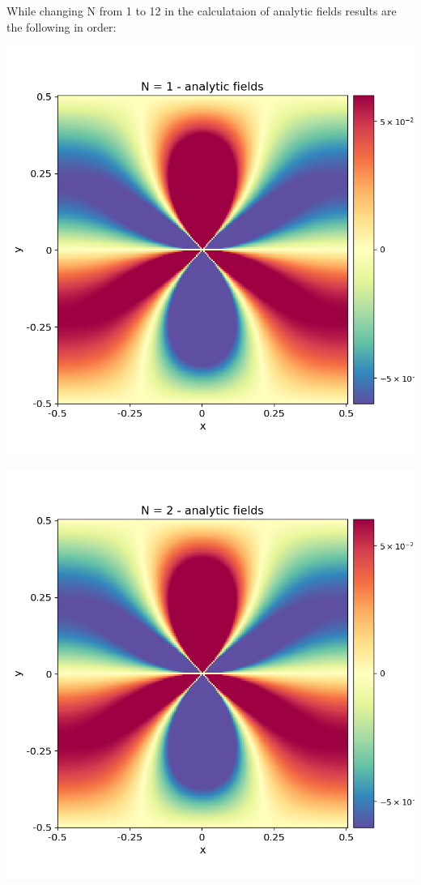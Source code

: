 \documentclass[12pt,a4paper]{article}
\theoremstyle{plain}
\begin{document}
\begin{multicols*}{2}
	\par While changing N from 1 to 12 in the calculataion of analytic fields results are the
	following in order:

	\vspace{1cm}

	\begin{minipage}{0.22\columnwidth}
		\centering
		\includegraphics[width=\columnwidth]{./stress_field_01.png}
	\end{minipage}
	\begin{minipage}{0.22\columnwidth}
		\centering
		\includegraphics[width=\columnwidth]{./stress_field_02.png}

\end{minipage}
\end{multicols*}
\end{document}
